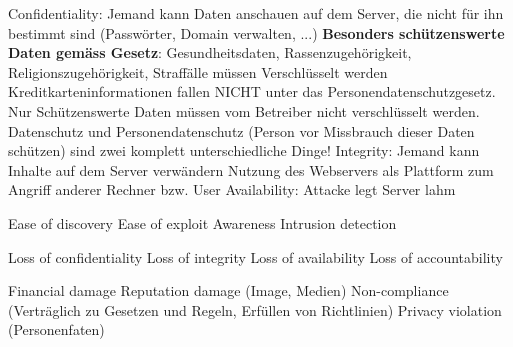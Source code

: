 \documentclass[ngerman,a4paper,12pt]{scrreprt}
\begin{document}
\ul
	\li Confidentiality: Jemand kann Daten anschauen auf dem Server, die nicht für ihn bestimmt sind (Passwörter, Domain verwalten, ...)
		\ul
			\li \textbf{Besonders schützenswerte Daten gemäss Gesetz}: Gesundheitsdaten, Rassenzugehörigkeit, Religionszugehörigkeit, Straffälle \ra müssen Verschlüsselt werden
			\li Kreditkarteninformationen fallen NICHT unter das Personendatenschutzgesetz.
			\li Nur Schützenswerte Daten müssen vom Betreiber nicht verschlüsselt werden.
			\li Datenschutz und Personendatenschutz (Person vor Missbrauch dieser Daten schützen) sind zwei komplett unterschiedliche Dinge!
		\ulE
	\li Integrity: 
		\ul
			\li Jemand kann Inhalte auf dem Server verwändern
			\li Nutzung des Webservers als Plattform zum Angriff anderer Rechner bzw. User
		\ulE
	\li Availability: Attacke legt Server lahm
\ulE
{}


\ul
	\li  Ease of discovery
 	\li Ease of exploit
 	\li Awareness
 	\li Intrusion detection
\ulE

\ul
	\li  Loss of confidentiality
 	\li Loss of integrity
 	\li Loss of availability
 	\li Loss of accountability
\ulE

\ul
	\li Financial damage
 	\li Reputation damage (Image, Medien)
 	\li Non-compliance (Verträglich zu Gesetzen und Regeln, Erfüllen von Richtlinien)
 	\li Privacy violation (Personenfaten)
\ulE


\end{document}
